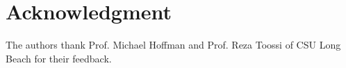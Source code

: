 \documentclass[final,journal,10pt,letterpaper,oneside,twocolumn,compsoc]%
{IEEEtran}
\begin{document}

%





\section*{Acknowledgment}


The authors thank Prof. Michael Hoffman and Prof. Reza Toossi
of CSU Long Beach for their feedback.


\ifCLASSOPTIONcaptionsoff
  \newpage
\fi
\end{document}
